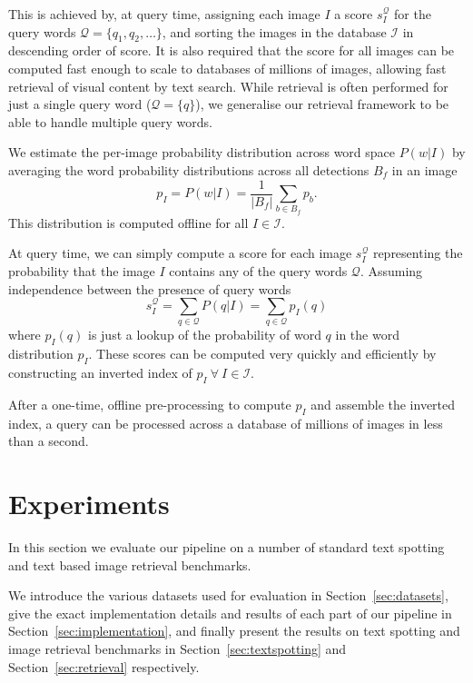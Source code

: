\documentclass[twocolumn]{svjour3}          \smartqed  \usepackage{epsfig}
\begin{document}
This is achieved by, at query time, assigning each image $I$ a score $s^\mathcal{Q}_I$ for the query words $\mathcal{Q} = \{q_1,q_2,\ldots\}$, and sorting the images in the database $\mathcal{I}$ in descending order of score. It is also required that the score for all images can be computed fast enough to scale to databases of millions of images, allowing fast retrieval of visual content by text search. While retrieval is often performed for just a single query word ($\mathcal{Q} = \{q\}$), we generalise our retrieval framework to be able to handle multiple query words.

We estimate the per-image probability distribution across word space $P(w|I)$ by averaging the word probability distributions across all detections $B_f$ in an image
\begin{equation}
p_I = P(w|I) = \frac{1}{|B_f|}\sum_{b \in B_f} p_b.
\end{equation}
This distribution is computed offline for all $I \in \mathcal{I}$.

At query time, we can simply compute a score for each image $s^\mathcal{Q}_I$ representing the probability that the image $I$ contains any of the query words $\mathcal{Q}$. Assuming independence between the presence of query words
\begin{equation}
s^\mathcal{Q}_I = \sum_{q \in \mathcal{Q}} P(q|I) = \sum_{q \in \mathcal{Q}} p_I(q)
\end{equation}
where $p_I(q)$ is just a lookup of the probability of word $q$ in the word distribution $p_I$. 
These scores can be computed very quickly and efficiently by constructing an inverted index of $p_I~\forall~I \in \mathcal{I}$.

After a one-time, offline pre-processing to compute $p_I$ and assemble the inverted index, a query can be processed across a database of millions of images in less than a second.

\section{Experiments}
\label{sec:experiments}

In this section we evaluate our pipeline on a number of standard text spotting and text based image retrieval benchmarks. 

We introduce the various datasets used for evaluation in Section~\ref{sec:datasets}, give the exact implementation details and results of each part of our pipeline in Section~\ref{sec:implementation}, and finally present the results on text spotting and image retrieval benchmarks in Section~\ref{sec:textspotting} and Section~\ref{sec:retrieval} respectively.
\end{document}
